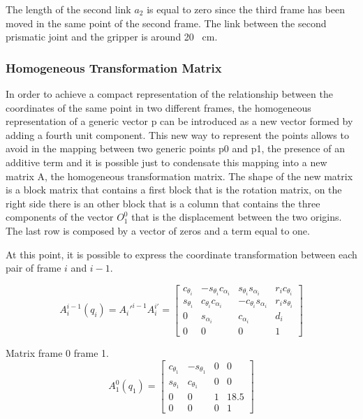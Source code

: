The length of the second link $a_2$ is equal to zero since the third frame has been moved in the same point of the second frame. The link between the second prismatic joint and the gripper is around 20 \SI{}{\centi\metre}.

\subsubsection{Homogeneous Transformation Matrix}
In order to achieve a compact representation of the relationship between the coordinates of the same point in two different frames, the homogeneous representation of a generic vector p can be introduced as a new vector formed by adding a fourth unit component. This new way to represent the points allows to avoid in the mapping between two generic points p0 and p1, the presence of an additive term and it is possible just to condensate this mapping into a new matrix A, the homogeneous transformation matrix. 
\newpage
The shape of the new matrix is a block matrix that contains a first block that is the rotation matrix, on the right side there is an other block that is a column that contains the three components of the vector $O_1^0$ that is the displacement between the two origins. The last row is composed by a vector of zeros and a term equal to one.

At this point, it is possible to express the coordinate transformation between each pair of frame $i$ and $i-1$.

\begin{equation}
    A_i^{i-1}(q_i) =  A_i'^{i-1} A_i^{i'} = 
    \begin{bmatrix}
    c_{\theta_i} & -s_{\theta_i}c_{\alpha_i} & s_{\theta_i}s_{\alpha_i} &r_i c_{\theta_i}\\
    s_{\theta_i} & c_{\theta_i}c_{\alpha_i} & -c_{\theta_i}s_{\alpha_i} &r_i s_{\theta_i}\\
     0 & s_{\alpha_i} & c_{\alpha_i} &d_i\\
    0&0&0&1
    \end{bmatrix}
\end{equation}

Matrix frame 0 frame 1.
\begin{equation}
    A_1^{0}(q_1) = 
    \begin{bmatrix}
    c_{\theta_1} & -s_{\theta_1} & 0 &0\\
    s_{\theta_1} & c_{\theta_1} & 0 &0\\
     0 & 0 & 1 &18.5\\
    0&0&0&1
    \end{bmatrix}
\end{equation}

